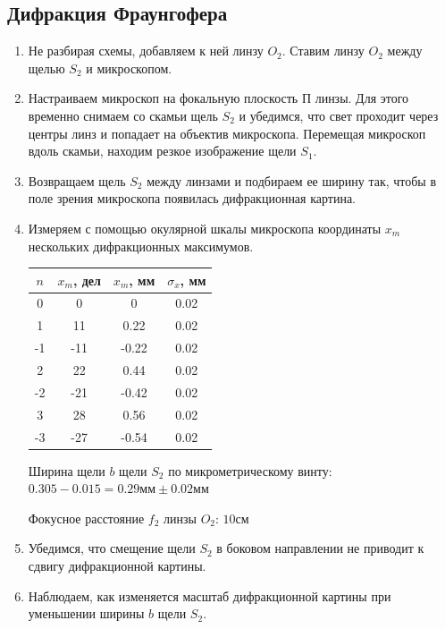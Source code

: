 \documentclass[a4paper,12pt]{article}
\begin{document}
\subsection{Дифракция Фраунгофера}
\begin{enumerate}
    \item Не разбирая схемы, добавляем к ней линзу $O_2$. Ставим линзу $O_2$ между щелью $S_2$ и микроскопом.
    \item Настраиваем микроскоп на фокальную плоскость П линзы. Для этого временно снимаем со скамьи щель $S_2$ и убедимся, что свет проходит через центры линз и попадает на объектив микроскопа. Перемещая микроскоп вдоль скамьи, находим резкое изображение щели $S_1$. 
    \item Возвращаем щель $S_2$ между линзами и подбираем ее ширину так, чтобы в поле зрения микроскопа появилась дифракционная картина.
    \item Измеряем с помощью окулярной шкалы микроскопа координаты $x_m$ нескольких дифракционных максимумов.
    
    \begin{table}[h!]
    \centering
    \begin{tabular}{||c|c|c|c||}
    \hline
        $n$ & $x_m$, дел & $x_m$, мм & $\sigma_x$, мм \\
        \hline
        0 & 0 & 0 & 0.02 \\
        1 & 11 & 0.22 & 0.02 \\
        -1 & -11 & -0.22 & 0.02 \\
        2 & 22 & 0.44 & 0.02 \\
        -2 & -21 & -0.42 & 0.02 \\
        3 & 28 & 0.56 & 0.02 \\
        -3 & -27 & -0.54 & 0.02 \\
        \hline
    \end{tabular}
    \end{table}

    Ширина щели $b$ щели $S_2$ по микрометрическому винту: $0.305-0.015 = 0.29\text{мм}\pm0.02\text{мм}$

    Фокусное расстояние $f_2$ линзы $O_2$: $10\text{см}$
    \item Убедимся, что смещение щели $S_2$ в боковом направлении не приводит к сдвигу дифракционной картины.


    \item Наблюдаем, как изменяется масштаб дифракционной картины при уменьшении ширины $b$ щели $S_2$.


\end{enumerate}
\end{document}
